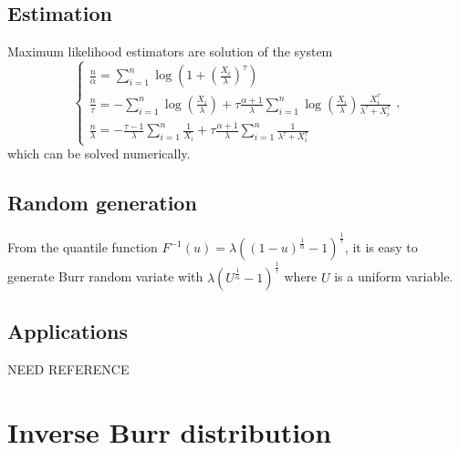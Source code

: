 \subsection{Estimation}
Maximum likelihood estimators are solution of the system
$$
\left\{
\begin{array}{l}
\frac{n}{\alpha}=\sum\limits_{i=1}^n\log \left(1+ \left(\frac{X_i}{\lambda}\right)^\tau\right)\\
\frac{n}{\tau}=-\sum\limits_{i=1}^n\log \left(\frac{X_i}{\lambda}\right)
+\tau\frac{\alpha+1}{\lambda}\sum\limits_{i=1}^n \log \left(\frac{X_i}{\lambda}\right) \frac{X_i^\tau}{\lambda^\tau+X_i^\tau}\\
\frac{n}{\lambda} = -\frac{\tau-1}{\lambda}\sum\limits_{i=1}^n\frac{1}{X_i}
+\tau\frac{\alpha+1}{\lambda}\sum\limits_{i=1}^n\frac{1}{\lambda^\tau+X_i^\tau}
\end{array}
\right. ,
$$
which can be solved numerically.

\subsection{Random generation}
From the quantile function $F^{-1}(u) = \lambda((1-u)^{\frac{1}{\alpha}} -1 )^{\frac{1}{\tau}}$, it is easy to generate Burr random variate with $\lambda(U^{\frac{1}{\alpha}} -1 )^{\frac{1}{\tau}}$ where $U$ is a uniform variable.

\subsection{Applications}
NEED REFERENCE

\newpage
\section{Inverse Burr distribution}

